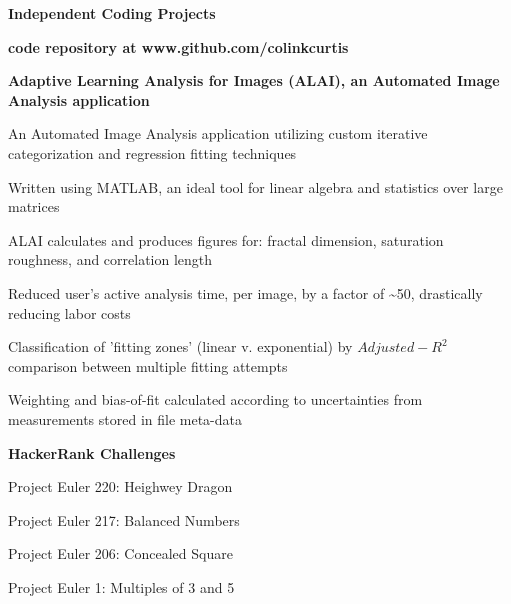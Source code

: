 \documentclass[letterpaper,final]{memoir}
\newcommand{\Sep}{\vspace{1.0em}}
\newcommand{\SmallSep}{\vspace{0.4em}}
\newcommand{\CVSection}[1]
	{\LARGE\textbf{#1}\par
	\SmallSep\normalsize}
\newcommand{\CVItem}[1]
	{\textbf{\color{Blue} #1}}
\begin{document}

\notoserif \CVSection{Independent Coding Projects}

\normalfont

\SmallSep

\CVItem{code repository at www.github.com/colinkcurtis}

\Sep

\CVItem{Adaptive Learning Analysis for Images (ALAI), an Automated Image Analysis application}
\SmallSep

\begin{compactitem}[\color{Blue}$\circ$]

    \item An Automated Image Analysis application utilizing custom iterative categorization and regression fitting techniques
    \SmallSep
    \item Written using MATLAB, an ideal tool for linear algebra and statistics over large matrices
    \SmallSep
    \item ALAI calculates and produces figures for: fractal dimension, saturation roughness, and correlation length
    \SmallSep
    \item Reduced user's active analysis time, per image, by a factor of \textasciitilde 50, drastically reducing labor costs
    \SmallSep
    \item Classification of 'fitting zones' (linear v. exponential) by $Adjusted-R^2$ comparison between multiple fitting attempts
    \SmallSep
    \item Weighting and bias-of-fit calculated according to uncertainties from measurements stored in file meta-data

    \Sep

\end{compactitem}



\CVItem{HackerRank Challenges}
\SmallSep

\begin{multicols}{2}

    \begin{compactitem}[\color{Blue}$\circ$]


        \item Project Euler 220:    Heighwey Dragon
        \SmallSep
        \item Project Euler 217:    Balanced Numbers
        \SmallSep
        \item Project Euler 206:    Concealed Square
        \SmallSep
        \item Project Euler 1:      Multiples of 3 and 5


    \end{compactitem}

\end{multicols}
\end{document}
